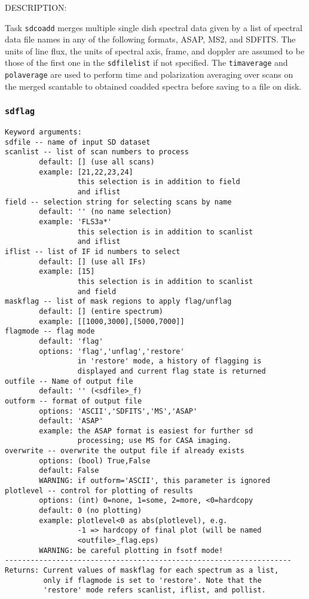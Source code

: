           DESCRIPTION:

          Task {\tt sdcoadd} merges multiple single dish spectral data given by
          a list of spectral data file names in any of the following formats,
          ASAP, MS2, and SDFITS.
          The units of line flux, the units of spectral axis, frame, and doppler
          are assumed to be those of the first one in the {\tt sdfilelist} if not
          specified.
          The {\tt timaverage} and {\tt polaverage} are used to perform time
          and polarization averaging over scans on the merged scantable to 
          obtained coadded spectra before saving to a file on disk.


\subsubsection{{\tt sdflag}}
\label{section:sd.sdtasks.tasks.sdflag}

\begin{verbatim}
Keyword arguments:
sdfile -- name of input SD dataset
scanlist -- list of scan numbers to process
        default: [] (use all scans)
        example: [21,22,23,24]
                 this selection is in addition to field
                 and iflist
field -- selection string for selecting scans by name
        default: '' (no name selection)
        example: 'FLS3a*'
                 this selection is in addition to scanlist
                 and iflist
iflist -- list of IF id numbers to select
        default: [] (use all IFs)
        example: [15]
                 this selection is in addition to scanlist
                 and field
maskflag -- list of mask regions to apply flag/unflag
        default: [] (entire spectrum)
        example: [[1000,3000],[5000,7000]]
flagmode -- flag mode
        default: 'flag'
        options: 'flag','unflag','restore'
                 in 'restore' mode, a history of flagging is
                 displayed and current flag state is returned
outfile -- Name of output file
        default: '' (<sdfile>_f)
outform -- format of output file
        options: 'ASCII','SDFITS','MS','ASAP'
        default: 'ASAP'
        example: the ASAP format is easiest for further sd
                 processing; use MS for CASA imaging.
overwrite -- overwrite the output file if already exists
        options: (bool) True,False
        default: False
        WARNING: if outform='ASCII', this parameter is ignored
plotlevel -- control for plotting of results
        options: (int) 0=none, 1=some, 2=more, <0=hardcopy
        default: 0 (no plotting)
        example: plotlevel<0 as abs(plotlevel), e.g.
                 -1 => hardcopy of final plot (will be named
                 <outfile>_flag.eps)
        WARNING: be careful plotting in fsotf mode!
-------------------------------------------------------------------
Returns: Current values of maskflag for each spectrum as a list,
         only if flagmode is set to 'restore'. Note that the
         'restore' mode refers scanlist, iflist, and pollist.


\end{verbatim}

